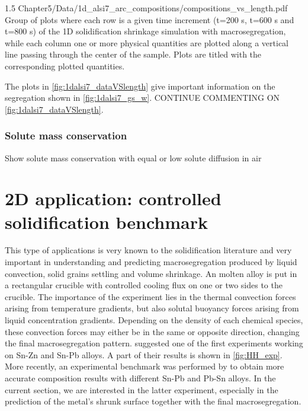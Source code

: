 \begin{landscape}
\begin{figureth}
{1.5}
{Chapter5/Data/1d_alsi7_arc_compositions/compositions_vs_length.pdf}
{Group of plots where each row is a given time increment (t=200 s, t=600 s and t=800 s) of the 1D solidification shrinkage simulation with macrosegregation, 
while each column one or more physical quantities are plotted along a vertical line passing through the center of the sample. Plots are titled with the corresponding plotted quantities.}
\label{fig:1dalsi7_dataVSlength}
\end{figureth}
\end{landscape}

The plots in \cref{fig:1dalsi7_dataVSlength} give important information on the segregation shown in  \cref{fig:1dalsi7_gs_w}.
CONTINUE COMMENTING ON \cref{fig:1dalsi7_dataVSlength}.


\subsubsection{Solute mass conservation}

Show solute mass conservation with equal or low solute diffusion in air









\section{2D application: controlled solidification benchmark}

This type of applications is very known to the solidification literature and very important in understanding and predicting macrosegregation produced by liquid convection,
solid grains settling and volume shrinkage.
An molten alloy is put in a rectangular crucible with controlled cooling flux on one or two sides to the crucible. The importance of the experiment lies in the 
thermal convection forces arising from temperature gradients, but also solutal buoyancy forces arising from liquid concentration gradients. 
Depending on the density of each chemical species, these convection forces may either be in the same or opposite direction, changing the final macrosegregation pattern.
\citet{hebditch_observations_1974} suggested one of the first experiments working on Sn-Zn and Sn-Pb alloys. A part of their results is shown in \cref{fig:HH_exp}. 
More recently, an experimental benchmark was performed by \citet{hachani_experimental_2012} to obtain more accurate 
composition results with different Sn-Pb and Pb-Sn alloys. In the current section, we are interested in the latter experiment, especially in the prediction
of the metal's shrunk surface together with the final macrosegregation.

